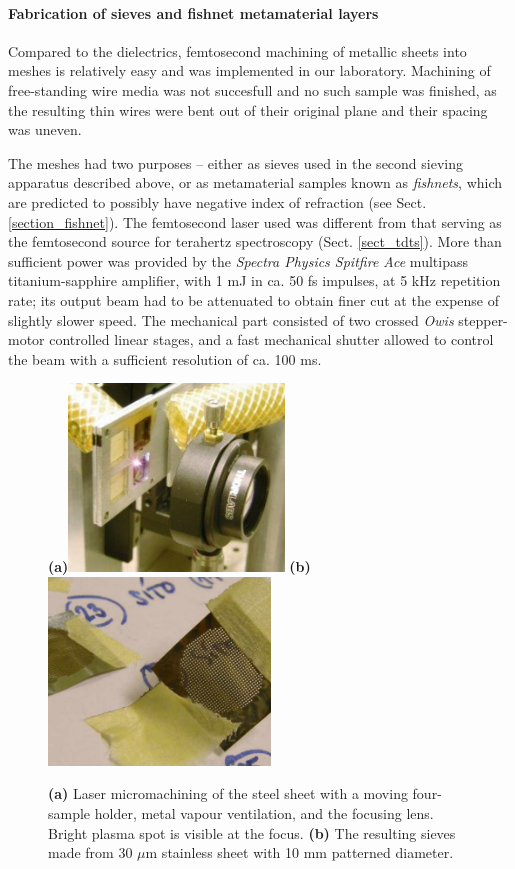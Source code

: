 \paragraph{Fabrication of sieves and fishnet metamaterial layers}%
Compared to the dielectrics, femtosecond machining of metallic sheets into meshes is relatively easy and was implemented in our laboratory. Machining of free-standing wire media was not succesfull and no such sample was finished, as the resulting thin wires were bent out of their original plane and their spacing was uneven.

The meshes had two purposes -- either as sieves used in the second sieving apparatus described above, or as metamaterial samples known as \textit{fishnets}, which are predicted to possibly have negative index of refraction (see Sect. \ref{section_fishnet}). 
The femtosecond laser used was different from that serving as the femtosecond source for terahertz spectroscopy (Sect. \ref{sect_tdts}). More than sufficient power was provided by the \textit{Spectra Physics Spitfire Ace} multipass titanium-sapphire amplifier, with 1 mJ in ca. 50 fs impulses, at 5 kHz repetition rate; its output beam had to be attenuated to obtain finer cut at the expense of slightly slower speed. The mechanical part consisted of two crossed \textit{Owis} stepper-motor controlled linear stages, and a fast mechanical shutter allowed to control the beam with a sufficient resolution of ca. 100 ms. 
\begin{figure}[ht] \caption{\textbf{(a)} Laser micromachining of the steel sheet with a moving four-sample holder, metal vapour ventilation, and the focusing lens. Bright plasma spot is visible at the focus. \textbf{(b)} The resulting sieves made from 30 $\mu$m stainless sheet with 10 mm patterned diameter.} \label{fg_microfab} \centering 
\textbf{(a)}\includegraphics[height=5cm]{img/technology/sieve2_drilling_m.pdf}
\textbf{(b)}\includegraphics[height=5cm]{img/technology/steel_sieve_on_paper.pdf}
\end{figure}

